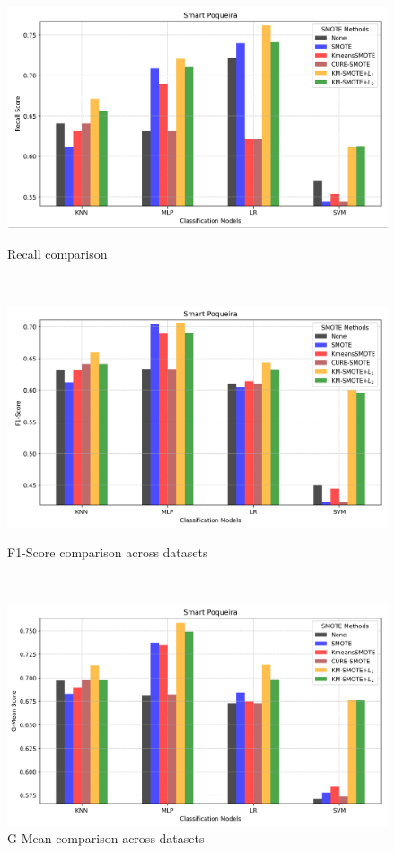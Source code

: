 \documentclass[12pt]{book}
\begin{document}
\begin{figure}[h]
    \centering
    \begin{minipage}{0.8\textwidth}
        \centering
        \includegraphics[width=\linewidth]{figures/recall.png}
        \caption{Recall comparison}
        \label{fig:grid_recall}
    \end{minipage}\\
    \begin{minipage}{0.8\textwidth}
        \centering
        \includegraphics[width=\linewidth]{figures/f1score.png}
        \caption{F1-Score comparison across datasets}
        \label{fig:grid_f1}
    \end{minipage}\\
    \begin{minipage}{0.8\textwidth}
        \centering
        \includegraphics[width=\linewidth]{figures/gmean.png}
        \caption{G-Mean comparison across datasets}
        \label{fig:grid_gmean}
    \end{minipage}
\end{figure}
\end{document}
